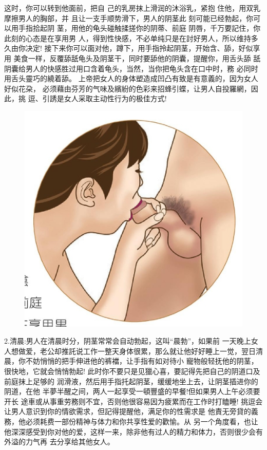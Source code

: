 \documentclass[12pt,UTF8]{ctexbook}
\begin{document}
这时，你可以转到他面前，把自
己的乳房抹上滑润的沐浴乳，紧抱
住他，用双乳摩擦男人的胸部，并
且让一支手顺势滑下，男人的阴茎此
刻可能已经勃起，你可以用手指拾起阴
茎，用他的龟头碰触揉搓你的阴蒂、前庭
阴唇，千万要記住，你此刻的心态是在享用男
人，得到性快感，不必单纯只是在討好男人，所以维持多久由你决定!
接下来你可以面对他，蹲下，用手指拎起阴茎，开始含、舔，好似享用
美食一样，反覆舔舐龟头及阴茎干，同时要舔他的阴囊，提醒你，用舌头舔
舐阴囊给男人的快感胜过用口含着龟头，当然，当你把龟头含在口中时，務
必同时用舌头靈巧的繞着舔。
上帝把女人的身体塑造成凹凸有致是有意義的，因为女人好似花朶，
必须藉由芬芳的气味及繽紛的色彩来招蜂引蝶，让男人自投羅網，因此，挑
逗、引誘是女人采取主动性行为的极佳方式!

\begin{figure}[htbp]
	\centering
	\includegraphics[width=0.7\linewidth]{15}
	\caption{}
	\label{fig:1}
\end{figure}

2.清晨:男人在清晨时分，阴茎常常会自动勃起，这叫“晨勃”，如果前
一天晚上女人想做爱，老公却推託说工作一整天身体很累，那么就让他好好睡上一觉，翌日清晨，你不妨悄悄的把手伸进他的裤襠，让手指有如对待小
寵物般轻抚他的阴茎，很快地，它就会悄悄勃起!
此时你不要只是见獵心喜，要記得先把自己的阴道口及前庭抹上足够的
润滑液，然后用手指托起阴茎，缓缓地坐上去，让阴茎插进你的阴道，在他
半夢半醒之间，两人一起享受一頓豐盛的早餐!但如果男人上午必须要开长
途車或从事重劳務则不宜，否则他很容易因为疲累而在工作时打瞌睡!
挑逗会让男人意识到你的情欲需求，但記得提醒他，满足你的性需求是
他責无旁貸的義務，他必须耗费一部份精神与体力和你共享性爱的歡愉。从
另一个角度看，也让他深深感受到你对他的爱，这样一来，除非他有过人的精力和体力，否则很少会有外溢的力气再
去分享给其他女人。
\end{document}
